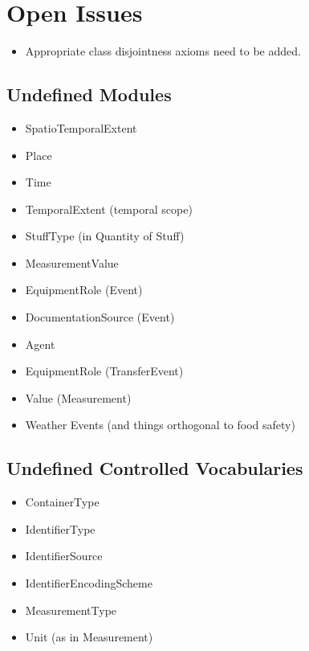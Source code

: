 \chapter{Open Issues}\label{chap:openissues}

\begin{itemize}
    \item Appropriate class disjointness axioms need to be added.
\end{itemize}

\section*{Undefined Modules}

\begin{itemize}
\item SpatioTemporalExtent
\item Place
\item Time
\item TemporalExtent (temporal scope)
\item StuffType (in Quantity of Stuff)
\item MeasurementValue
\item EquipmentRole (Event)
\item DocumentationSource (Event)
\item Agent
\item EquipmentRole (TransferEvent)
\item Value (Measurement)
\item Weather Events (and things orthogonal to food safety)
\end{itemize}

\section*{Undefined Controlled Vocabularies}

\begin{itemize}
\item ContainerType
\item IdentifierType
\item IdentifierSource
\item IdentifierEncodingScheme
\item MeasurementType
\item Unit (as in Measurement)
\end{itemize}
